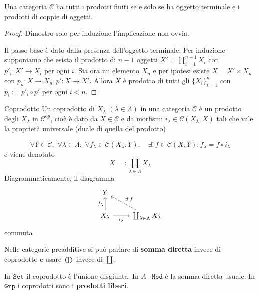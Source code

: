 \begin{proposition}{}
    Una categoria \(\mathcal{\mathcal{C}}\) ha tutti i prodotti finiti se e solo se ha
    oggetto terminale e i prodotti di coppie di oggetti.
\end{proposition}
\begin{proof}{}
    Dimostro solo per induzione l'implicazione non ovvia.

    Il passo base è dato dalla presenza dell'oggetto terminale.
    Per induzione supponiamo che esista
    il prodotto di \(n-1\) oggetti \(X'=\prod_{i = 1}^{n-1} X_i\) con \(p'_i :
    X' \to X_{i}\) per ogni \(i\). Sia ora un elemento \(X_n\) e per ipotesi
    esiste \(X = X' \times X_{n}\) con \(p_{n} : X \to X_{n}, p' : X \to X'\).
    Allora \(X\) è prodotto di tutti gli \(\{X_i\}_{i=1}^{n}\) con \(p_{i} :=
    p'_i \circ p'\) per ogni \(i < n\). 
\end{proof}

\begin{definition}{Coprodotto}
    Un coprodotto di \(X_\lambda\) \((\lambda \in \Lambda)\) in una categoria \(\mathcal{\mathcal{C}}\) è un prodotto degli \(X_\lambda\) in \(\mathcal{\mathcal{C}}^{op}\), cioè è dato da \(
    X \in \mathcal{\mathcal{C}}\) e da morfismi \(i_\lambda \in \mathcal{\mathcal{C}}{(X_\lambda, X)}\) tali che vale la proprietà universale (duale di quella del prodotto)

\[
  \forall Y \in \mathcal{C}, \,\, \forall \lambda \in \Lambda,\,\, \forall f_\lambda \in \mathcal{\mathcal{C}}{(X_\lambda, Y)}, \quad \exists ! \,f \in \mathcal{\mathcal{C}}{(X, Y)} : f_\lambda = f \circ i_\lambda
\]
e viene denotato 
\[
  X =: \coprod_{\lambda \in \Lambda} X_\lambda
\]
Diagrammaticamente, il diagramma
\[\begin{tikzcd}
	Y \\
	{X_\lambda} & \coprod_{\lambda \in \Lambda} X_\lambda
	\arrow["{f_\lambda}", from=2-1, to=1-1]
	\arrow["{i_\lambda}"', from=2-1, to=2-2]
	\arrow["{\exists! f}"', dashed, from=2-2, to=1-1]
\end{tikzcd}\]
commuta
\end{definition}

Nelle categorie preadditive si può parlare di \textbf{somma diretta} invece di
coprodotto e usare \(\bigoplus\) invece di \(\coprod\).

\begin{example}{}
    In \(\mathtt{Set}\) il coprodotto è l'unione disgiunta. In \(A\mathtt{-Mod}\) è la somma diretta usuale. In \(\mathtt{Grp}\) i coprodotti sono i \textbf{prodotti liberi}.
\end{example}

